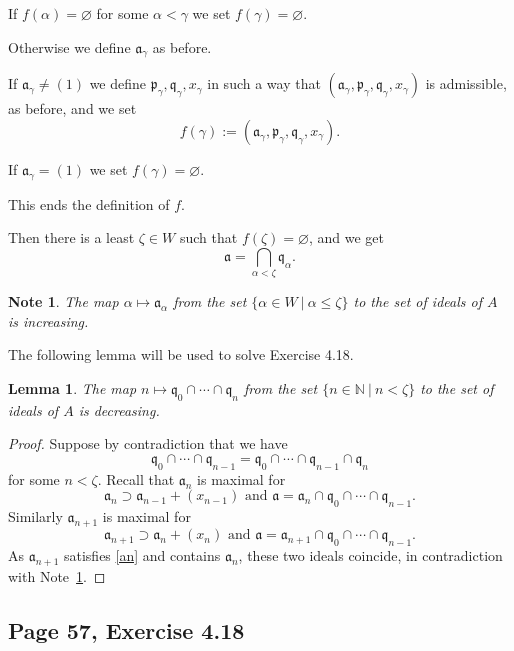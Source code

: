 \documentclass[parskip=half,fontsize=12pt]{scrartcl}%
\newcommand{\mf}{\mathfrak}
\newcommand{\aaa}{\mf a}
\newcommand{\ppp}{\mf p}
\newcommand{\qqq}{\mf q}
\newtheorem{lem}[thm]{Lemma}
\newtheorem{note}[thm]{Note}
\begin{document}
If $f(\alpha)=\varnothing$ for some $\alpha<\gamma$ we set $f(\gamma)=\varnothing$.

Otherwise we define $\aaa_\gamma$ as before.

If $\aaa_\gamma\ne(1)$ we define $\ppp_\gamma,\qqq_\gamma,x_\gamma$ in such a way that $(\aaa_\gamma,\ppp_\gamma,\qqq_\gamma,x_\gamma)$ is admissible, as before, and we set 
$$
f(\gamma):=(\aaa_{\gamma},\ppp_{\gamma},\qqq_{\gamma},x_{\gamma}).
$$ 

If $\aaa_\gamma=(1)$ we set $f(\gamma)=\varnothing$.

This ends the definition of $f$.

Then there is a least $\zeta\in W$ such that $f(\zeta)=\varnothing$, and we get 
\begin{equation}\label{abak}
\aaa=\bigcap_{\alpha<\zeta}\qqq_\alpha.
\end{equation} 
\begin{note}\label{amaa}
The map $\alpha\mapsto\aaa_\alpha$ from the set $\{\alpha\in W\ |\ \alpha\le\zeta\}$ to the set of ideals of $A$ is increasing.
\end{note} 
The following lemma will be used to solve Exercise 4.18. 
\begin{lem}\label{lasker}
The map $n\mapsto\qqq_0\cap\cdots\cap\qqq_n$ from the set $\{n\in\mathbb N\ |\ n<\zeta\}$ to the set of ideals of $A$ is decreasing.
\end{lem}
\begin{proof}
Suppose by contradiction that we have 
$$
\qqq_0\cap\cdots\cap\qqq_{n-1}=\qqq_0\cap\cdots\cap\qqq_{n-1}\cap\qqq_n
$$ 
for some $n<\zeta$. Recall that $\aaa_n$ is maximal for 
\begin{equation}\label{an}
\aaa_n\supset\aaa_{n-1}+(x_{n-1})\text{ and }\aaa=\aaa_n\cap\qqq_0\cap\cdots\cap\qqq_{n-1}.
\end{equation} 
Similarly $\aaa_{n+1}$ is maximal for 
$$%
\aaa_{n+1}\supset\aaa_n+(x_n)\text{ and }\aaa=\aaa_{n+1}\cap\qqq_0\cap\cdots\cap\qqq_{n-1}.
$$%
As $\aaa_{n+1}$ satisfies \eqref{an} and contains $\aaa_n$, these two ideals coincide, in contradiction with Note~\ref{amaa}. 
\end{proof}

\subsection{Page 57, Exercise 4.18}%
\end{document}
